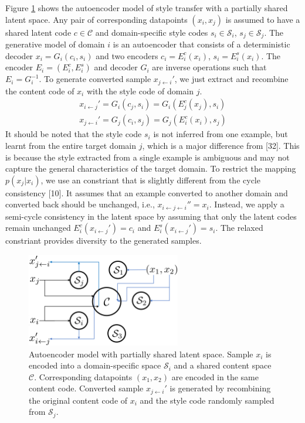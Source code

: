 \documentclass{article}
\begin{document}
Figure \ref{fig:model} shows the autoencoder model of style transfer with a partially shared latent space. Any pair of corresponding datapoints $(x_i, x_j)$ is assumed to have a shared latent code $c\in \mathcal{C}$ and domain-specific style codes $s_i\in \mathcal{S}_i$, $s_j\in \mathcal{S}_j$. The generative model of domain $i$ is an autoencoder that consists of a deterministic decoder $x_i = G_i(c_i,s_i)$ and two encoders $c_i = E_i^c(x_i)$, $s_i = E_i^s(x_i)$. The encoder $E_i = (E_i^c, E_i^s)$ and decoder $G_i$ are inverse operations such that $E_i = G_i^{-1}$. To generate converted sample $x_{j\leftarrow i}'$, we just extract and recombine the content code of $x_i$ with the style code of domain $j$.
\begin{equation}
\begin{aligned}
x_{i\leftarrow j}' = G_i(c_j, s_i) = G_i(E_j^c(x_j), s_i) \\
x_{j\leftarrow i}' = G_j(c_i, s_j) = G_j(E_i^c(x_i), s_j)
\end{aligned}
\end{equation}
It should be noted that the style code $s_i$ is not inferred from one example, but learnt from the entire target domain $j$, which is a major difference from [32]. This is because the style extracted from a single example is ambiguous and may not capture the general characteristics of the target domain. To restrict the mapping $p(x_j|x_i)$, we use an constriant that is slightly different from the cycle consistency [10]. It assumes that an example converted to another domain and converted back should be unchanged, i.e., $x_{i\leftarrow j\leftarrow i}'' = x_i$. Instead, we apply a semi-cycle consistency in the latent space by assuming that only the latent codes remain unchanged $E_i^c(x_{i\leftarrow j}') = c_i$ and $E_i^s(x_{i\leftarrow j}') = s_i$. The relaxed constriant provides diversity to the generated samples.

\begin{figure}[htb]
\center
\includegraphics[width=0.6\textwidth]{FIG/model}
\caption{Autoencoder model with partially shared latent space. Sample $x_i$ is encoded into a domain-specific space $\mathcal{S}_i$ and a shared content space $\mathcal{C}$. Corresponding datapoints $(x_1,x_2)$ are encoded in the same content code. Converted sample $x_{j\leftarrow i}'$ is generated by recombining the original content code of $x_i$ and the style code randomly sampled from $\mathcal{S}_j$.}
\label{fig:model}
\end{figure}
\end{document}
